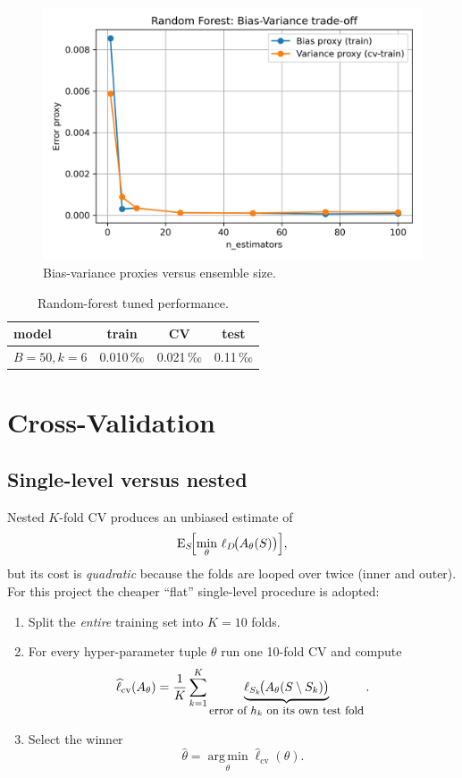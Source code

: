 \documentclass[12pt]{report}
\begin{document}
\begin{figure}[ht]
  \centering
  \includegraphics[width=.65\linewidth]{../plots/rf_sweep_bias_variance_approx.png}
  \caption{Bias-variance proxies versus ensemble size.}
  \label{fig:rf-bv}
\end{figure}

\begin{table}[ht]
  \centering
  \caption{Random-forest tuned performance.}
  \label{tab:rf-res}
  \begin{tabular}{lccc}
    \toprule
    model & train & CV & test \\ \midrule
    $B=50,k=6$ & 0.010\,‰ & 0.021\,‰ & 0.11\,‰ \\
    \bottomrule
  \end{tabular}
\end{table}

\section{Cross-Validation}

\subsection{Single-level versus nested}\label{sec:cv:why-single}

Nested $K$-fold CV produces an unbiased estimate of
\[
  \mathrm{E}_{S}\!\Bigl[\min_{\theta}
        \,\ell_{D}\!\bigl(A_{\theta}(S)\bigr)\Bigr],
\]
but its cost is \emph{quadratic} because the folds are looped over twice 
(inner and outer). For this project the cheaper “flat” single-level procedure is adopted:

\begin{enumerate}
  \item Split the \emph{entire} training set into $K=10$ folds.
  \item For every hyper-parameter tuple $\theta$ run one 10-fold CV and compute
        \[
          \widehat{\ell}_{\text{cv}}(A_{\theta})=
          \frac{1}{K}\sum_{k=1}^{K}
          \underbrace{\ell_{S_k}\!\bigl(A_{\theta}(S\setminus S_k)\bigr)}_{
          \text{\small error of $h_k$ on its own test fold}}
          .
        \]
  \item Select the winner
        \[
          \hat{\theta}=
          \operatorname*{arg\,min}_{\theta}\widehat{\ell}_{\text{cv}}(\theta).
        \]
\end{enumerate}
\end{document}
